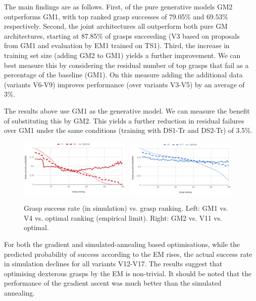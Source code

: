 The main findings are as follows. First, of the pure generative models GM2 outperforms GM1, with top ranked grasp successes of 79.05\% and 69.53\% respectively. Second, the joint architectures all outperform both pure GM architectures, starting at 87.85\% of grasps succeeding (V3 based on proposals from GM1 and evaluation by EM1 trained on TS1). Third, the increase in training set size (adding GM2 to GM1) yields a further improvement. We can best measure this by considering the residual number of top grasps that fail as a percentage of the baseline (GM1). On this measure adding the additional data (variants V6-V9) improves performance (over variants V3-V5) by an average of 3\%. 

The results above use GM1 as the generative model. We can measure the benefit of substituting this by GM2. This yields a further reduction in residual failures over GM1 under the same conditions (training with DS1-Tr and DS2-Tr) of 3.5\%.

\begin{figure}[t]
\begin{center}
\includegraphics[width=0.48\textwidth]{images/svr_gm1}~
\includegraphics[width=0.48\textwidth]{images/svr_gm2}
\caption{Grasp success rate (in simulation) vs. grasp ranking. Left: GM1 vs. V4 vs. optimal ranking (empirical limit). Right: GM2 vs. V11 vs. optimal.\label{fig:successvsranking}}
\end{center}
\end{figure}


For both the gradient and simulated-annealing based optimisations, while the predicted probability of success according to the EM rises, the actual success rate in simulation declines for all variants V12-V17. The results suggest that optimising dexterous grasps by the EM is non-trivial. It should be noted that the performance of the gradient ascent was much better than the simulated annealing.

